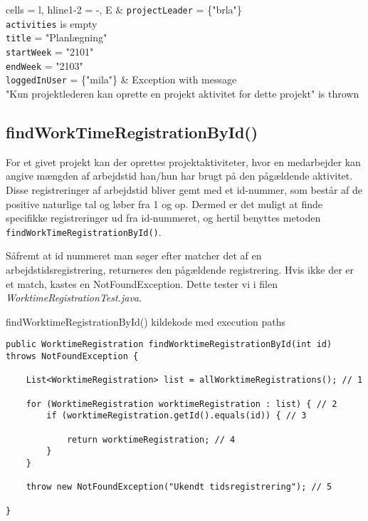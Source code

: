 \begin{table}[H]
\begin{tblr}{
  cells = {l},
  hline{1-2} = {-}{},
}
E & 
{
    \texttt{projectLeader} = \{"brla"\} \\
    \texttt{activities} is empty \\
    \texttt{title} = "Planlægning" \\
    \texttt{startWeek} = "2101" \\ 
    \texttt{endWeek} = "2103" \\
    \texttt{loggedInUser} = \{"mila"\}
} & 
{
    Exception with message \\ 
    "Kun projektlederen kan oprette en projekt aktivitet for dette projekt" is thrown
} \\

\end{tblr}
\end{table}

\subsection{findWorkTimeRegistrationById()} \label{sec:white_box_find_work_time}

For et givet projekt kan der oprettes projektaktiviteter, hvor en medarbejder kan angive mængden af arbejdstid han/hun har brugt på den pågældende aktivitet. Disse registreringer af arbejdstid bliver gemt med et id-nummer, som består af de positive naturlige tal og løber fra 1 og op. Dermed er det muligt at finde specifikke registreringer ud fra id-nummeret, og hertil benyttes metoden \texttt{findWorkTimeRegistrationById()}. 

Såfremt at id nummeret man søger efter matcher det af en arbejdstidsregistrering, returneres den pågældende registrering. Hvis ikke der er et match, kastes en NotFoundException. Dette tester vi i filen \textit{WorktimeRegistrationTest.java}.

\begin{listing}[H]
    \centering
    \caption{findWorktimeRegistrationById() kildekode med execution paths}\label{lst:find_work_time_registration_by_id_source_code}
    \begin{verbatim}
public WorktimeRegistration findWorktimeRegistrationById(int id) throws NotFoundException {
    
    List<WorktimeRegistration> list = allWorktimeRegistrations(); // 1

    for (WorktimeRegistration worktimeRegistration : list) { // 2
        if (worktimeRegistration.getId().equals(id)) { // 3
            
            return worktimeRegistration; // 4
        }
    }

    throw new NotFoundException("Ukendt tidsregistrering"); // 5

}
    \end{verbatim}
\end{listing}


